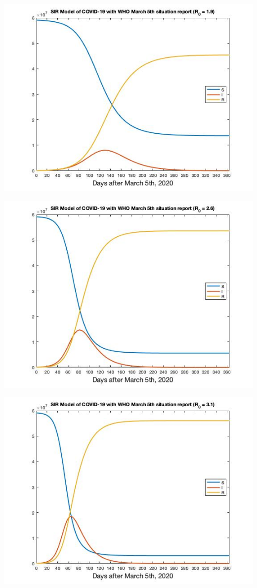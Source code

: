 \documentclass[12pt, a4paper]{article}
\begin{document}
   \includegraphics[scale=0.75]{plots/whosir19.jpg}
   
   \includegraphics[scale=0.75]{plots/whosir26.jpg}
   
   \includegraphics[scale=0.75]{plots/whosir31.jpg}
        
\end{document}
